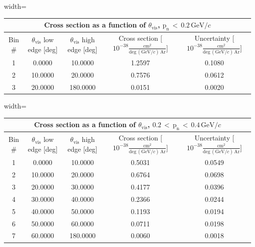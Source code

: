 \begin{table}[H]
\raggedright
\begin{adjustbox}{width=\textwidth}
\small
\begin{tabular}{ |c|c|c|c|c| }
\hline
\multicolumn{5}{|c|}{Cross section as a function of $\theta_{\mathrm{vis}}$, $\mathrm{p_{n}\,<\,0.2\,GeV/\textit{c}}$} \\
\hline
\hline
Bin \# & $\theta_{\mathrm{vis}}$ low edge [deg] & $\theta_{\mathrm{vis}}$ high edge [deg] & Cross section [$10^{-38}\mathrm{\frac{cm^{2}}{deg\,(GeV/\textit{c})\,Ar}}$] & Uncertainty [$10^{-38}\mathrm{\frac{cm^{2}}{deg\,(GeV/\textit{c})\,Ar}}$] \\
\hline
\hline
1 & 0.0000 & 10.0000 & 1.2597 & 0.1080\\
2 & 10.0000 & 20.0000 & 0.7576 & 0.0612\\
3 & 20.0000 & 180.0000 & 0.0151 & 0.0020\\
\hline
\end{tabular}
\end{adjustbox}
\end{table}


\begin{table}[H]
\raggedright
\begin{adjustbox}{width=\textwidth}
\small
\begin{tabular}{ |c|c|c|c|c| }
\hline
\multicolumn{5}{|c|}{Cross section as a function of $\theta_{\mathrm{vis}}$, $\mathrm{0.2\,<\,p_{n}\,<\,0.4\,GeV/\textit{c}}$} \\
\hline
\hline
Bin \# & $\theta_{\mathrm{vis}}$ low edge [deg] & $\theta_{\mathrm{vis}}$ high edge [deg] & Cross section [$10^{-38}\mathrm{\frac{cm^{2}}{deg\,(GeV/\textit{c})\,Ar}}$] & Uncertainty [$10^{-38}\mathrm{\frac{cm^{2}}{deg\,(GeV/\textit{c})\,Ar}}$] \\
\hline
\hline
1 & 0.0000 & 10.0000 & 0.5031 & 0.0549\\
2 & 10.0000 & 20.0000 & 0.6764 & 0.0698\\
3 & 20.0000 & 30.0000 & 0.4177 & 0.0396\\
4 & 30.0000 & 40.0000 & 0.2366 & 0.0244\\
5 & 40.0000 & 50.0000 & 0.1193 & 0.0194\\
6 & 50.0000 & 60.0000 & 0.0711 & 0.0198\\
7 & 60.0000 & 180.0000 & 0.0060 & 0.0018\\
\hline
\end{tabular}
\end{adjustbox}
\end{table}



